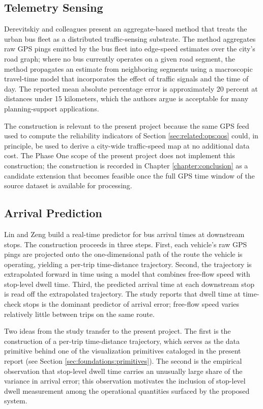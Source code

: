 \subsection{Telemetry Sensing}
\label{sec:related:ops:sensing}

Derevitskiy and colleagues \cite{derevitskiy2016} present an aggregate-based method that
treats the urban bus fleet as a distributed traffic-sensing substrate. The method
aggregates raw GPS pings emitted by the bus fleet into edge-speed estimates over the
city's road graph; where no bus currently operates on a given road segment, the method
propagates an estimate from neighboring segments using a macroscopic travel-time model
that incorporates the effect of traffic signals and the time of day. The reported mean
absolute percentage error is approximately 20 percent at distances under 15 kilometers,
which the authors argue is acceptable for many planning-support applications.

The construction is relevant to the present project because the same GPS feed used to
compute the reliability indicators of Section \ref{sec:related:ops:qos} could, in
principle, be used to derive a city-wide traffic-speed map at no additional data cost.
The Phase One scope of the present project does not implement this construction; the
construction is recorded in Chapter \ref{chapter:conclusion} as a candidate extension that
becomes feasible once the full GPS time window of the source dataset is available for
processing.

\subsection{Arrival Prediction}
\label{sec:related:ops:arrival}

Lin and Zeng \cite{linzeng2014} build a real-time predictor for bus arrival times at
downstream stops. The construction proceeds in three steps. First, each vehicle's raw
GPS pings are projected onto the one-dimensional path of the route the vehicle is
operating, yielding a per-trip time-distance trajectory. Second, the trajectory is
extrapolated forward in time using a model that combines free-flow speed with stop-level
dwell time. Third, the predicted arrival time at each downstream stop is read off the
extrapolated trajectory. The study reports that dwell time at time-check stops is the
dominant predictor of arrival error; free-flow speed varies relatively little between
trips on the same route.

Two ideas from the study transfer to the present project. The first is the construction
of a per-trip time-distance trajectory, which serves as the data primitive behind one of
the visualization primitives cataloged in the present report (see Section
\ref{sec:foundations:primitives}). The second is the empirical observation that
stop-level dwell time carries an unusually large share of the variance in arrival error;
this observation motivates the inclusion of stop-level dwell measurement among the
operational quantities surfaced by the proposed system.
